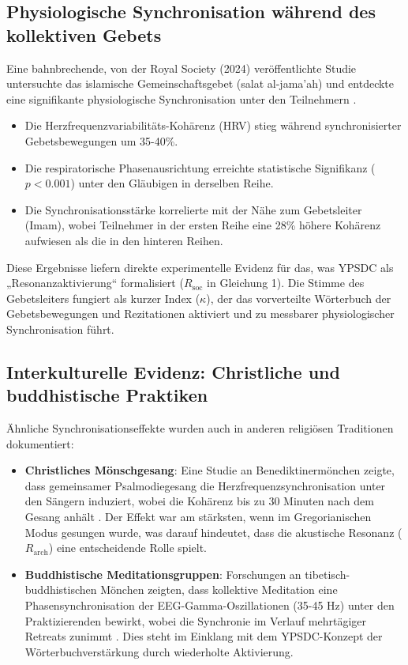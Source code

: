 \documentclass[12pt,a4paper]{article}
\begin{document}
	\subsection{Physiologische Synchronisation während des kollektiven Gebets}
	
	Eine bahnbrechende, von der Royal Society (2024) veröffentlichte Studie untersuchte das islamische Gemeinschaftsgebet (salat al-jama'ah) und entdeckte eine signifikante physiologische Synchronisation unter den Teilnehmern \cite{RoyalSociety2024}.
	\begin{itemize}
		\item Die Herzfrequenzvariabilitäts-Kohärenz (HRV) stieg während synchronisierter Gebetsbewegungen um 35-40\%.
		\item Die respiratorische Phasenausrichtung erreichte statistische Signifikanz ($p < 0.001$) unter den Gläubigen in derselben Reihe.
		\item Die Synchronisationsstärke korrelierte mit der Nähe zum Gebetsleiter (Imam), wobei Teilnehmer in der ersten Reihe eine 28\% höhere Kohärenz aufwiesen als die in den hinteren Reihen.
	\end{itemize}
	
	Diese Ergebnisse liefern direkte experimentelle Evidenz für das, was YPSDC als „Resonanzaktivierung“ formalisiert ($R_{\mathrm{soc}}$ in Gleichung 1). Die Stimme des Gebetsleiters fungiert als kurzer Index ($\kappa$), der das vorverteilte Wörterbuch der Gebetsbewegungen und Rezitationen aktiviert und zu messbarer physiologischer Synchronisation führt.
	
	\subsection{Interkulturelle Evidenz: Christliche und buddhistische Praktiken}
	
	Ähnliche Synchronisationseffekte wurden auch in anderen religiösen Traditionen dokumentiert:
	
	\begin{itemize}
		\item \textbf{Christliches Mönschgesang}: Eine Studie an Benediktinermönchen zeigte, dass gemeinsamer Psalmodiegesang die Herzfrequenzsynchronisation unter den Sängern induziert, wobei die Kohärenz bis zu 30 Minuten nach dem Gesang anhält \cite{Craswell2023}. Der Effekt war am stärksten, wenn im Gregorianischen Modus gesungen wurde, was darauf hindeutet, dass die akustische Resonanz ($R_{\mathrm{arch}}$) eine entscheidende Rolle spielt.
		
		\item \textbf{Buddhistische Meditationsgruppen}: Forschungen an tibetisch-buddhistischen Mönchen zeigten, dass kollektive Meditation eine Phasensynchronisation der EEG-Gamma-Oszillationen (35-45 Hz) unter den Praktizierenden bewirkt, wobei die Synchronie im Verlauf mehrtägiger Retreats zunimmt \cite{Lutz2017}. Dies steht im Einklang mit dem YPSDC-Konzept der Wörterbuchverstärkung durch wiederholte Aktivierung.
	\end{itemize}
	
\end{document}
